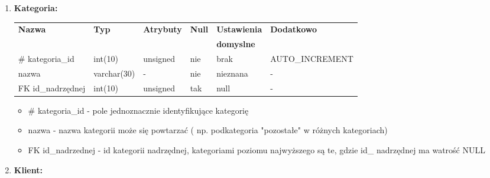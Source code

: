 \begin{enumerate}
\item \textbf{Kategoria:}

\begin{tabular}{|l|l|l|l|l|l|} \hline
	\textbf{Nazwa} & \textbf{Typ} & \textbf{Atrybuty} & \textbf{Null} & \textbf{Ustawienia} & \textbf{Dodatkowo} \\
	&&&&\textbf{domyslne}&\\
	\hline
	\# kategoria\_id&int(10)&unsigned&nie&brak&AUTO\_INCREMENT \\
	nazwa&varchar(30)& - &nie& nieznana& - \\
	FK id\_nadrzędnej&int(10)&unsigned&tak&null& - \\
	\hline
\end{tabular}

\begin{itemize}
	\item \# kategoria\_id - pole jednoznacznie identyfikujące kategorię
	\item nazwa - nazwa kategorii może się powtarzać ( np. podkategoria "pozostałe" w różnych kategoriach)
	\item FK id\_nadrzednej - id kategorii nadrzędnej, kategoriami poziomu najwyższego są te, gdzie id\_ nadrzędnej ma watrość NULL
\end{itemize}
\item \textbf{Klient:}


\end{enumerate}

